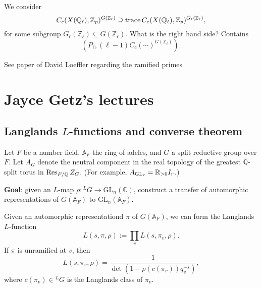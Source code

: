 \documentclass[reqno]{amsart} 
\numberwithin{theorem}{section}
\numberwithin{equation}{section}
\numberwithin{exercise}{section}
\begin{document}
\begin{remark}\label{remark:cq6tho73c6}
  We consider
  \begin{equation*}
    C_c(X(\mathbb{Q}_{\ell}), \mathbb{Z}_p)^{G(\mathbb{Z}_{\ell})}
    \supseteq \operatorname{trace} C_c(X(\mathbb{Q}_{\ell}), \mathbb{Z}_p)^{G_{\ell}(\mathbb{Z}_{\ell})},
  \end{equation*}
  for some subgroup $G_{\ell}(\mathbb{Z}_{\ell}) \subseteq G(\mathbb{Z}_{\ell})$.  What is the right hand side?  Contains
  \begin{equation*}
    \left( P_{\ell} ,(\ell - 1) C_c(\dotsb)^{G(\mathbb{Z}_{\ell})} \right).
  \end{equation*}
\end{remark}
\begin{remark}\label{remark:cq6tho71jb}
  See paper of David Loeffler regarding the ramified primes
\end{remark}


\section{Jayce Getz's lectures}\label{sec:cq6tho1wyu}
\subsection{Langlands $L$-functions and converse theorem}\label{sec:cq6tho1xqr}

Let $F$ be a number field, $\mathbb{A}_F$ the ring of adeles, and $G$ a split reductive group over $F$.  Let $A_G$ denote the neutral component in the real topology of the greatest $\mathbb{Q}$-split torus in $\operatorname{Res}_{F / \mathbb{Q}} Z_G$.  (For example, $A_{\operatorname{GL}_r} = \mathbb{R}_{> 0} I_r$.)


\textbf{Goal}: given an $L$-map $\rho : {}^L G \rightarrow \mathrm{GL}_n(\mathbb{C})$, construct a transfer of automorphic representations of $G(\mathbb{A}_F)$ to $\mathrm{GL}_n(\mathbb{A}_F)$.

Given an automorphic representationd $\pi$ of $G(\mathbb{A}_F)$, we can form the Langlands $L$-function
\begin{equation*}
  L(s, \pi, \rho) := \prod_v L(s, \pi_v, \rho).
\end{equation*}
If $\pi$ is unramified at $v$, then
\begin{equation*}
  L(s, \pi_v, \rho) = \frac{1}{\det(1 - \rho(c(\pi_v)) q_v^{- s})},
\end{equation*}
where $c(\pi_v) \in{}^L G$ is the Langlands class of $\pi_v$.
\end{document}
